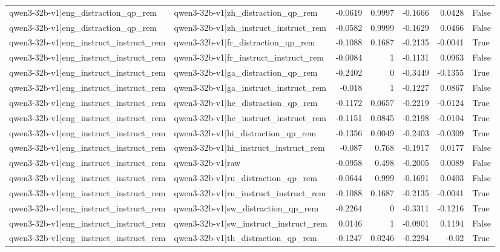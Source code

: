 \begin{table}
\begin{tabular}{l l r r r r l}
qwen3-32b-v1|eng_distraction_qp_rem & qwen3-32b-v1|zh_distraction_qp_rem & -0.0619 & 0.9997 & -0.1666 & 0.0428 & False \\
qwen3-32b-v1|eng_distraction_qp_rem & qwen3-32b-v1|zh_instruct_instruct_rem & -0.0582 & 0.9999 & -0.1629 & 0.0466 & False \\
qwen3-32b-v1|eng_instruct_instruct_rem & qwen3-32b-v1|fr_distraction_qp_rem & -0.1088 & 0.1687 & -0.2135 & -0.0041 & True \\
qwen3-32b-v1|eng_instruct_instruct_rem & qwen3-32b-v1|fr_instruct_instruct_rem & -0.0084 & 1 & -0.1131 & 0.0963 & False \\
qwen3-32b-v1|eng_instruct_instruct_rem & qwen3-32b-v1|ga_distraction_qp_rem & -0.2402 & 0 & -0.3449 & -0.1355 & True \\
qwen3-32b-v1|eng_instruct_instruct_rem & qwen3-32b-v1|ga_instruct_instruct_rem & -0.018 & 1 & -0.1227 & 0.0867 & False \\
qwen3-32b-v1|eng_instruct_instruct_rem & qwen3-32b-v1|he_distraction_qp_rem & -0.1172 & 0.0657 & -0.2219 & -0.0124 & True \\
qwen3-32b-v1|eng_instruct_instruct_rem & qwen3-32b-v1|he_instruct_instruct_rem & -0.1151 & 0.0845 & -0.2198 & -0.0104 & True \\
qwen3-32b-v1|eng_instruct_instruct_rem & qwen3-32b-v1|hi_distraction_qp_rem & -0.1356 & 0.0049 & -0.2403 & -0.0309 & True \\
qwen3-32b-v1|eng_instruct_instruct_rem & qwen3-32b-v1|hi_instruct_instruct_rem & -0.087 & 0.768 & -0.1917 & 0.0177 & False \\
qwen3-32b-v1|eng_instruct_instruct_rem & qwen3-32b-v1|raw & -0.0958 & 0.498 & -0.2005 & 0.0089 & False \\
qwen3-32b-v1|eng_instruct_instruct_rem & qwen3-32b-v1|ru_distraction_qp_rem & -0.0644 & 0.999 & -0.1691 & 0.0403 & False \\
qwen3-32b-v1|eng_instruct_instruct_rem & qwen3-32b-v1|ru_instruct_instruct_rem & -0.1088 & 0.1687 & -0.2135 & -0.0041 & True \\
qwen3-32b-v1|eng_instruct_instruct_rem & qwen3-32b-v1|sw_distraction_qp_rem & -0.2264 & 0 & -0.3311 & -0.1216 & True \\
qwen3-32b-v1|eng_instruct_instruct_rem & qwen3-32b-v1|sw_instruct_instruct_rem & 0.0146 & 1 & -0.0901 & 0.1194 & False \\
qwen3-32b-v1|eng_instruct_instruct_rem & qwen3-32b-v1|th_distraction_qp_rem & -0.1247 & 0.0246 & -0.2294 & -0.02 & True \\

\end{tabular}
\end{table}
